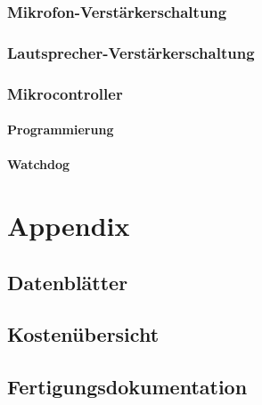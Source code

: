 \documentclass[a4paper, 12pt, twoside, openright
]{memoir}
\newcommand{\AndreasGrain}{Andreas Grain}
\newcommand{\MatthiasMair}{Matthias Mair}
\newcommand{\authorName}{\AndreasGrain\ / \MatthiasMair}
\begin{document}
\section{Mikrofon-Verstärkerschaltung}
\section{Lautsprecher-Verstärkerschaltung}
\section{Mikrocontroller}
\subsection{Programmierung}
\subsection{Watchdog}
\cleartoverso

\renewcommand{\authorName}{\AndreasGrain / \MatthiasMair}
\appendix
\printbibliography\clearpage
\printacronyms[heading=chapter*,name=Abkürzungen]\clearpage
\listoffigures\clearpage
\listoftables\clearpage

\part{Appendix}
\chapter{Datenblätter}
\chapter{Kostenübersicht}
\chapter{Fertigungsdokumentation}
\end{document}
